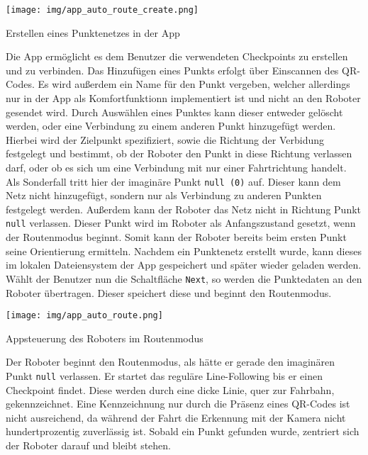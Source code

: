 \documentclass[12pt, a4paper]{report}
\begin{document}
\begin{minipage}{\linewidth}
   \centering
   \captionsetup{type=figure, justification=centering}
   \texttt{[image: img/app\_auto\_route\_create.png]}
   \caption{Erstellen eines Punktenetzes in der App}
\end{minipage}
\vspace*{0.25cm}

Die App ermöglicht es dem Benutzer die verwendeten Checkpoints zu erstellen und zu verbinden. Das Hinzufügen eines Punkts erfolgt über Einscannen des QR-Codes. Es wird außerdem ein Name für den Punkt vergeben, welcher allerdings nur in der App als Komfortfunktionn implementiert ist und nicht an den Roboter gesendet wird. Durch Auswählen eines Punktes kann dieser entweder gelöscht werden, oder eine Verbindung zu einem anderen Punkt hinzugefügt werden. Hierbei wird der Zielpunkt spezifiziert, sowie die Richtung der Verbidung festgelegt und bestimmt, ob der Roboter den Punkt in diese Richtung verlassen darf, oder ob es sich um eine Verbindung mit nur einer Fahrtrichtung handelt. Als Sonderfall tritt hier der imaginäre Punkt \texttt{null (0)} auf. Dieser kann dem Netz nicht hinzugefügt, sondern nur als Verbindung zu anderen Punkten festgelegt werden. Außerdem kann der Roboter das Netz nicht in Richtung Punkt \texttt{null} verlassen. Dieser Punkt wird im Roboter als Anfangszustand gesetzt, wenn der Routenmodus beginnt. Somit kann der Roboter bereits beim ersten Punkt seine Orientierung ermitteln. Nachdem ein Punktenetz erstellt wurde, kann dieses im lokalen Dateiensystem der App gespeichert und später wieder geladen werden. Wählt der Benutzer nun die Schaltfläche \texttt{Next}, so werden die Punktedaten an den Roboter übertragen. Dieser speichert diese und beginnt den Routenmodus.

\newpage

\begin{minipage}{\linewidth}
   \centering
   \captionsetup{type=figure, justification=centering}
   \texttt{[image: img/app\_auto\_route.png]}
   \caption{Appsteuerung des Roboters im Routenmodus}
\end{minipage}
\vspace*{0.25cm}

Der Roboter beginnt den Routenmodus, als hätte er gerade den imaginären Punkt \texttt{null} verlassen. Er startet das reguläre Line-Following bis er einen Checkpoint findet. Diese werden durch eine dicke Linie, quer zur Fahrbahn, gekennzeichnet. Eine Kennzeichnung nur durch die Präsenz eines QR-Codes ist nicht ausreichend, da während der Fahrt die Erkennung mit der Kamera nicht hundertprozentig zuverlässig ist. Sobald ein Punkt gefunden wurde, zentriert sich der Roboter darauf und bleibt stehen.
\end{document}

